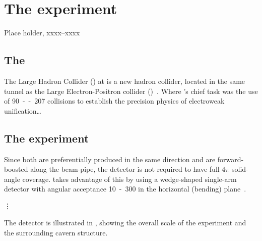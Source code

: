 \chapter{The \LHCb experiment}
\label{chap:MoreStuff}

%
{Place holder, xxxx--xxxx}%

\section{The \LHC}
The Large Hadron Collider (\LHC) at \CERN is a new hadron collider,
located in the same tunnel as the Large Electron-Positron collider
(\LEP)~\cite{Brianti:2004qq}. Where \LEP's chief task was the use
of \unit{90--207}{\GeV} \epluseminus collisions to establish the
precision physics of electroweak unification\dots


\section{The \LHCb experiment}
\label{sec:LHCbInDetail}

Since both  are preferentially produced in the same direction
and are forward-boosted along the beam-pipe, the detector is not required
to have full $4\pi$ solid-angle coverage. \LHCb takes advantage of this
by using a wedge-shaped single-arm detector with angular acceptance
\unit{10-300}{\mrad} in the horizontal (bending) plane~\cite{Amato:1998xt}.

\vspace{1cm}

\begin{center}
{\hspace{1mm}\Large\vdots\hspace{1cm}}
\end{center}

\vspace{1cm}

The detector is illustrated in , showing
the overall scale of the experiment and the surrounding cavern structure.

